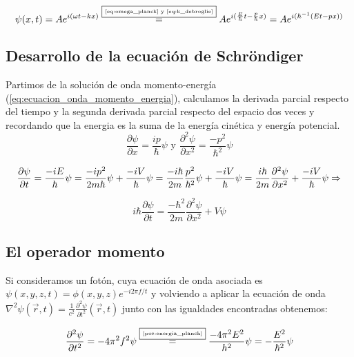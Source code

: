 \begin{equation}
    \label{eq:ecuacion_onda_momento_energia}
    \psi(x,t)=Ae^{i(\omega t-kx)}\overset{\fbox{\tiny \ref{eq:omega_planck} y \ref{eq:k_debroglie}}}{=}Ae^{i(\frac{E}{\hbar} t-\frac{p}{\hbar}x)}=Ae^{i(\hbar^{-1}(E t-p x))}
\end{equation}

\subsection{Desarrollo de la ecuación de Schröndiger}\label{subsec:desarrollo-de-la-ecuación-de-schrondiger}

Partimos de la solución de onda momento-energía (\ref{eq:ecuacion_onda_momento_energia}), calculamos la derivada parcial respecto del tiempo y la segunda derivada parcial respecto del espacio dos veces y recordando que la energia es la suma de la energía cinética y energía potencial.
\begin{equation*}
    \frac{\partial\psi}{\partial x}=\frac{ip}{\hbar}\psi\text{ y }\frac{\partial^2\psi}{\partial x^2}=\frac{-p^2}{\hbar^2}\psi
\end{equation*}

\begin{equation*}
    \frac{\partial\psi}{\partial t}=\frac{-iE}{\hbar}\psi=\frac{-ip^2}{2m\hbar}\psi+\frac{-iV}{\hbar}\psi=\frac{-i\hbar}{2m}\frac{p^2}{\hbar^2}\psi+\frac{-iV}{\hbar}\psi=\frac{i\hbar}{2m}\frac{\partial^2\psi}{\partial x^2}+\frac{-iV}{\hbar}\psi\Rightarrow
\end{equation*}

\begin{equation}
    \label{eq:desarrollo-3ecuacion-schrodinger}
    i\hbar\frac{\partial\psi}{\partial t}=\frac{-\hbar^2}{2m}\frac{\partial^2\psi}{\partial x^2}+V\psi
\end{equation}

\subsection{El operador momento}

Si consideramos un fotón, cuya ecuación de onda asociada es $\psi(x,y,z,t)=\phi(x,y,z)e^{-i2\pi f/t}$ y volviendo a aplicar la ecuación de onda $\nabla^2\psi(\vec {r},t)=\frac {1}{c^2}\frac{\partial^2\psi}{\partial t^2}(\vec {r},t)$ junto con las igualdades encontradas obtenemos:

\begin{equation*}
    \frac{\partial^2 \psi}{\partial t^2}=-4\pi^2 f^2\psi\overset{\fbox{\tiny \ref{pos:energia_planck}}}{=}\frac{-4\pi^2 E^2}{h^2}\psi=-\frac{E^2}{\hbar^2}\psi
\end{equation*}

